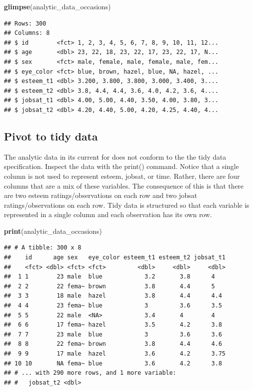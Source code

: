 \documentclass[
]{krantz}
\makeatletter
\newenvironment{Shaded}{\begin{snugshade}}{\end{snugshade}}
\newcommand{\KeywordTok}[1]{\textcolor[rgb]{0.27,0.27,0.27}{\textbf{#1}}}
\newcommand{\NormalTok}[1]{#1}
\newenvironment{kframe}{%
\medskip{}
\setlength{\fboxsep}{.8em}
 \def\at@end@of@kframe{}%
 \ifinner\ifhmode%
  \def\at@end@of@kframe{\end{minipage}}%
  \begin{minipage}{\columnwidth}%
 \fi\fi%
 \def\FrameCommand##1{\hskip\@totalleftmargin \hskip-\fboxsep
 \colorbox{shadecolor}{##1}\hskip-\fboxsep
     \hskip-\linewidth \hskip-\@totalleftmargin \hskip\columnwidth}%
 \MakeFramed {\advance\hsize-\width
   \@totalleftmargin\z@ \linewidth\hsize
   \@setminipage}}%
 {\par\unskip\endMakeFramed%
 \at@end@of@kframe}
\renewenvironment{Shaded}{\begin{kframe}}{\end{kframe}}
\makeatother
\begin{document}
\begin{Shaded}
\begin{Highlighting}[]
\KeywordTok{glimpse}\NormalTok{(analytic_data_occasions)}
\end{Highlighting}
\end{Shaded}

\begin{verbatim}
## Rows: 300
## Columns: 8
## $ id        <fct> 1, 2, 3, 4, 5, 6, 7, 8, 9, 10, 11, 12...
## $ age       <dbl> 23, 22, 18, 23, 22, 17, 23, 22, 17, N...
## $ sex       <fct> male, female, male, female, male, fem...
## $ eye_color <fct> blue, brown, hazel, blue, NA, hazel, ...
## $ esteem_t1 <dbl> 3.200, 3.800, 3.800, 3.000, 3.400, 3....
## $ esteem_t2 <dbl> 3.8, 4.4, 4.4, 3.6, 4.0, 4.2, 3.6, 4....
## $ jobsat_t1 <dbl> 4.00, 5.00, 4.40, 3.50, 4.00, 3.80, 3...
## $ jobsat_t2 <dbl> 4.20, 4.40, 5.00, 4.20, 4.25, 4.40, 4...
\end{verbatim}

\hypertarget{pivot-to-tidy-data-2}{%
\subsection{Pivot to tidy data}\label{pivot-to-tidy-data-2}}

The analytic data in its current for does not conform to the the tidy data specification. Inspect the data with the print() command.
Notice that a single column is not used to represent esteem, jobsat, or time. Rather, there are four columns that are a mix of these variables. The consequence of this is that there are two esteem ratings/observations on each row and two jobsat ratings/observations on each row. Tidy data is structured so that each variable is represented in a single column and each observation has its own row.

\begin{Shaded}
\begin{Highlighting}[]
\KeywordTok{print}\NormalTok{(analytic_data_occasions)}
\end{Highlighting}
\end{Shaded}

\begin{verbatim}
## # A tibble: 300 x 8
##    id      age sex   eye_color esteem_t1 esteem_t2 jobsat_t1
##    <fct> <dbl> <fct> <fct>         <dbl>     <dbl>     <dbl>
##  1 1        23 male  blue            3.2       3.8      4   
##  2 2        22 fema~ brown           3.8       4.4      5   
##  3 3        18 male  hazel           3.8       4.4      4.4 
##  4 4        23 fema~ blue            3         3.6      3.5 
##  5 5        22 male  <NA>            3.4       4        4   
##  6 6        17 fema~ hazel           3.5       4.2      3.8 
##  7 7        23 male  blue            3         3.6      3.6 
##  8 8        22 fema~ brown           3.8       4.4      4.6 
##  9 9        17 male  hazel           3.6       4.2      3.75
## 10 10       NA fema~ blue            3.6       4.2      3.8 
## # ... with 290 more rows, and 1 more variable:
## #   jobsat_t2 <dbl>
\end{verbatim}
\end{document}
